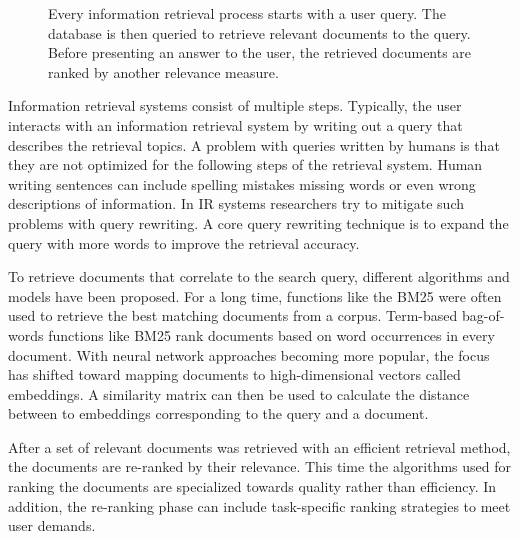 \documentclass[../main.tex]{subfiles}
\begin{document}
\begin{figure}[t]
    \centering
    \caption{Every information retrieval process starts with a user query.
        The database is then queried to retrieve relevant documents to the query.
        Before presenting an answer to the user, the retrieved documents are ranked by another relevance measure.}
    \label{fig:ir_steps}
\end{figure}
Information retrieval systems consist of multiple steps.
Typically, the user interacts with an information retrieval system by writing out a query that describes the retrieval topics.
A problem with queries written by humans is that they are not optimized for the following steps of the retrieval system.
Human writing sentences can include spelling mistakes missing words or even wrong descriptions of information.
In IR systems researchers try to mitigate such problems with query rewriting.
A core query rewriting technique is to expand the query with more words to improve the retrieval accuracy.

To retrieve documents that correlate to the search query,
different algorithms and models have been proposed.
For a long time, functions like the BM25 \cite{Robertson2009}
were often used to retrieve the best matching documents from a corpus.
Term-based bag-of-words functions like BM25 rank documents based on word occurrences in every document.
With neural network approaches becoming more popular,
the focus has shifted toward mapping documents to high-dimensional vectors called embeddings.
A similarity matrix can then be used to calculate the distance between to embeddings corresponding to the query and a document.

After a set of relevant documents was retrieved with an efficient retrieval method,
the documents are re-ranked by their relevance.
This time the algorithms used for ranking the documents are specialized towards quality rather than efficiency.
In addition, the re-ranking phase can include task-specific ranking strategies to meet user demands.
\end{document}
